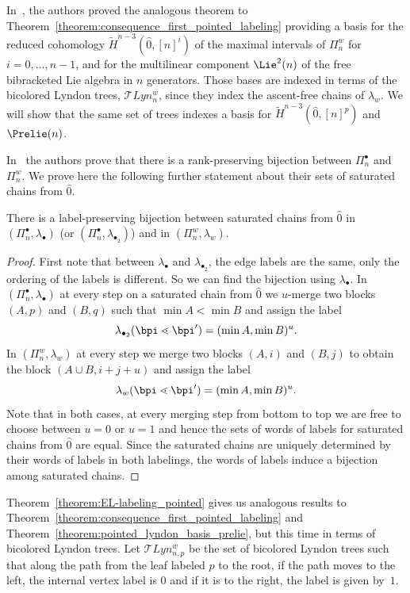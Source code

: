     In~\cite{GonzalezDleonWachs2016}, the authors proved the analogous theorem to Theorem~\ref{theorem:consequence_first_pointed_labeling} providing a basis for the reduced cohomology $\widetilde H^{n-3}(\hat{0},[n]^i)$ of the maximal intervals of $\Pi_n^w$ for $i=0,\dots, n-1$, and for the multilinear component $\Lie^2(n)$ of the free bibracketed Lie algebra in $n$ generators. Those bases are indexed in terms of the bicolored Lyndon trees, $\mathcal{T}Lyn^{w}_{n}$,  since they index the ascent-free chains of $\lambda_{w}$. We will show that the same set of trees indexes a basis for $\widetilde H^{n-3}(\hat{0},[n]^p)$ and  $\Prelie(n)$.



    In~\cite{GonzalezDleonWachs2016} the authors prove that there is a rank-preserving bijection between $\Pi_n^{\bullet}$ and $\Pi_n^{w}$. We prove here the following further statement about their sets of saturated chains from $\hat{0}$.

    \begin{theo}\label{Theorem:label-preserving_bijection}
        There is a label-preserving bijection between saturated chains from $\hat{0}$ in $(\Pi_n^{\bullet},\lambda_{\bullet})$ (or $(\Pi_n^{\bullet},\lambda_{\bullet_2})$) and in $(\Pi_n^{w},\lambda_{w})$.
    \end{theo}
    \begin{proof}
    First note that between $\lambda_{\bullet}$ and $\lambda_{\bullet_2}$, the edge labels are the same, only the ordering of the labels is different. So we can find the bijection using $\lambda_{\bullet}$. 
        In $(\Pi_n^{\bullet},\lambda_{\bullet})$ at every step on a saturated chain from $\hat{0}$ we  $u$-merge two blocks $(A,p)$ and $(B,q)$ such that $\min A < \min B$ and assign the label $$\lambda_{\bullet_2}(\bpi\lessdot \bpi')=(\min A, \min B)^u.$$ 
        In $(\Pi_n^{w},\lambda_{w})$ at every step we  merge two blocks $(A,i)$ and $(B,j)$ to obtain the block $(A\cup B, i+j+u)$ and assign the label $$\lambda_{w}(\bpi\lessdot \bpi')=(\min A, \min B)^u.$$
         Note that in both cases, at every merging step from bottom to top we are free to choose between $u=0$ or $u=1$ and hence the sets of words of labels for saturated chains from $\hat{0}$ are equal. Since the saturated chains are uniquely determined by their words of labels in both labelings, the words of labels induce a bijection among saturated chains.
    \end{proof}

     Theorem~\ref{theorem:EL-labeling_pointed} gives us analogous results to  Theorem~\ref{theorem:consequence_first_pointed_labeling} and Theorem~\ref{theorem:pointed_lyndon_basis_prelie}, but this time in terms of bicolored Lyndon trees.
     Let  $\mathcal{T}Lyn_{n,p}^{w}$ be the set of bicolored Lyndon trees such that along the path from the leaf labeled $p$ to the root, if the path moves to the left, the internal vertex label is $0$ and if it is to the right, the label is given by~$1$.

